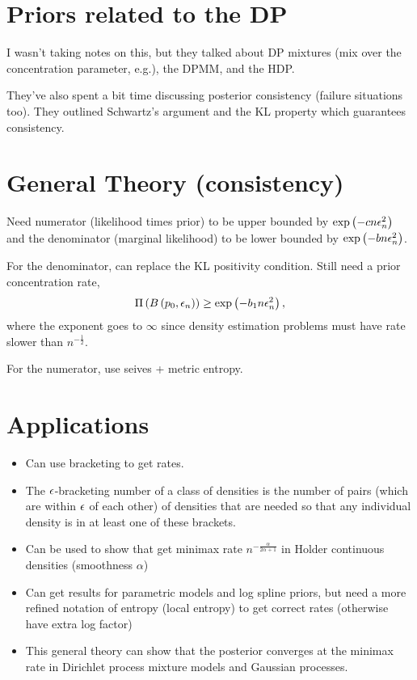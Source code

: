 \documentclass{article}
\begin{document}
\section{Priors related to the DP}

I wasn't taking notes on this, but they talked about DP mixtures (mix over the
concentration parameter, e.g.), the DPMM, and the HDP.

They've also spent a bit time discussing posterior consistency (failure
situations too). They outlined Schwartz's argument and the KL property which
guarantees consistency.

\section{General Theory (consistency)}

Need numerator (likelihood times prior) to be upper bounded by
$\operatorname{exp}\left(-cn\epsilon_{n}^{2}\right)$ and the denominator (marginal likelihood) to be lower
bounded by $\operatorname{exp}\left(-bn\epsilon_{n}^{2}\right)$.

For the denominator, can replace the KL positivity condition. Still need a prior
concentration rate,
\begin{align}
\Pi\left(B\left(p_{0}, \epsilon_{n}\right)\right) \geq \operatorname{exp}\left(-b_{1}n\epsilon_{n}^{2}\right),
\end{align}
where the exponent goes to $\infty$ since density estimation problems must have
rate slower than $n^{-\frac{1}{2}}$.

For the numerator, use seives + metric entropy.

\section{Applications}

\begin{itemize}
\item Can use bracketing to get rates.
\item The $\epsilon$-bracketing number of a class of densities is the number of
  pairs (which are within $\epsilon$ of each other) of densities that are needed
  so that any individual density is in at least one of these brackets.
\item Can be used to show that get minimax rate $n^{-\frac{\alpha}{2\alpha +
    1}}$ in Holder continuous densities (smoothness $\alpha$)
\item Can get results for parametric models and log spline priors, but need
  a more refined notation of entropy (local entropy) to get correct rates
  (otherwise have extra log factor)
\item This general theory can show that the posterior converges at the minimax
  rate in Dirichlet process mixture models and Gaussian processes.
\end{itemize}
\end{document}
